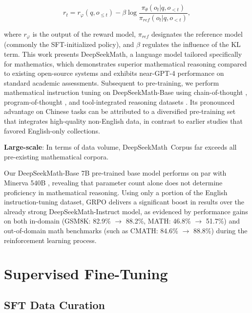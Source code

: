 \begin{equation}
    r_{t} = r_\varphi(q, o_{\le t}) - \beta \log\frac{\pi_{\theta}(o_{t}|q, o_{<t})}{\pi_{ref}(o_{t}|q, o_{<t})},
\label{eq:PPO-reward}
\end{equation}

where $r_\varphi$ is the output of the reward model, $\pi_{ref}$ designates the reference model (commonly the SFT-initialized policy), and $\beta$ regulates the influence of the KL term. This work presents DeepSeekMath, a language model tailored specifically for mathematics, which demonstrates superior mathematical reasoning compared to existing open-source systems and exhibits near-GPT-4 performance on standard academic assessments. Subsequent to pre-training, we perform mathematical instruction tuning on DeepSeekMath-Base using chain-of-thought \citep{cot}, program-of-thought \citep{pot,pal}, and tool-integrated reasoning datasets \citep{tora}. Its pronounced advantage on Chinese tasks can be attributed to a diversified pre-training set that integrates high-quality non-English data, in contrast to earlier studies \citep{minerva,llemma} that favored English-only collections. \item \textbf{Large-scale}: 
    In terms of data volume, DeepSeekMath~Corpus far exceeds all pre-existing mathematical corpora. \item Our DeepSeekMath-Base 7B pre-trained base model performs on par with Minerva 540B \citep{minerva}, revealing that parameter count alone does not determine proficiency in mathematical reasoning. Using only a portion of the English instruction-tuning dataset, GRPO delivers a significant boost in results over the already strong DeepSeekMath-Instruct model, as evidenced by performance gains on both in-domain (GSM8K: 82.9\% $\rightarrow$ 88.2\%, MATH: 46.8\% $\rightarrow$ 51.7\%) and out-of-domain math benchmarks (such as CMATH: 84.6\% $\rightarrow$ 88.8\%) during the reinforcement learning process. \section{Supervised Fine-Tuning}

\subsection{SFT Data Curation}

